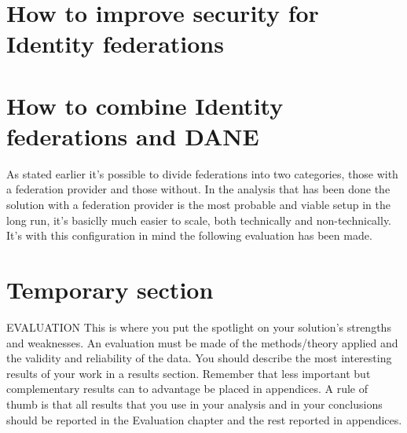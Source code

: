 \section{How to improve security for Identity federations}
\section{How to combine Identity federations and DANE}
As stated earlier it's possible to divide federations into two categories, those with a federation provider and those without.
In the analysis that has been done the solution with a federation provider is the most probable and viable setup in the long run, it's basiclly much easier to scale, both technically and non-technically.
It's with this configuration in mind the following evaluation has been made.




\section{Temporary section}
EVALUATION This is where you put the spotlight on your solution's strengths and
weaknesses. An evaluation must be made of the methods/theory applied and the validity
and reliability of the data. You should describe the most interesting results of your work in a
results section. Remember that less important but complementary results can to advantage
be placed in appendices. A rule of thumb is that all results that you use in your analysis and
in your conclusions should be reported in the Evaluation chapter and the rest reported in
appendices.

